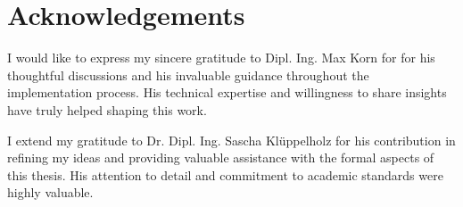\documentclass[preview]{standalone}
\begin{document}
	\clearpage
	\thispagestyle{empty}
	\section*{Acknowledgements}	
	I would like to express my sincere gratitude to Dipl. Ing. Max Korn for for his thoughtful discussions and his invaluable guidance throughout the implementation process. His technical expertise and willingness to share insights have truly helped shaping this work. \newline
	
	\noindent I extend my gratitude to Dr. Dipl. Ing. Sascha Klüppelholz for his contribution in refining my ideas and providing valuable assistance with the formal aspects of this thesis. His attention to detail and commitment to academic standards were highly valuable.
	
%
\end{document}
